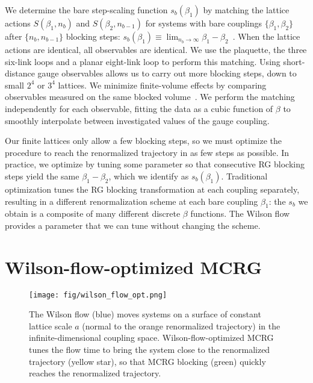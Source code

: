 \documentclass{PoS}
\newcommand{\be}{\ensuremath{\beta} }
\begin{document}
We determine the bare step-scaling function $s_b(\be_1)$ by matching the lattice actions $S(\be_1, n_b)$ and $S(\be_2, n_{b - 1})$ for systems with bare couplings $\{\be_1, \be_2\}$ after $\{n_b, n_{b - 1}\}$ blocking steps: $s_b(\be_1) \equiv \lim_{n_b \to \infty} \be_1 - \be_2$~\cite{Petropoulos:2012mg}.
When the lattice actions are identical, all observables are identical.
We use the plaquette, the three six-link loops and a planar eight-link loop to perform this matching.
Using short-distance gauge observables allows us to carry out more blocking steps, down to small $2^4$ or $3^4$ lattices.
We minimize finite-volume effects by comparing observables measured on the same blocked volume~\cite{Hasenfratz:2011xn}.
We perform the matching independently for each observable, fitting the data as a cubic function of \be to smoothly interpolate between investigated values of the gauge coupling.

Our finite lattices only allow a few blocking steps, so we must optimize the procedure to reach the renormalized trajectory in as few steps as possible.
In practice, we optimize by tuning some parameter so that consecutive RG blocking steps yield the same $\be_1 - \be_2$, which we identify as $s_b(\be_1)$.
Traditional optimization tunes the RG blocking transformation at each coupling separately, resulting in a different renormalization scheme at each bare coupling $\be_1$: the $s_b$ we obtain is a composite of many different discrete \be functions.
The Wilson flow provides a parameter that we can tune without changing the scheme.



\section{\label{sec:wmcrg}Wilson-flow-optimized MCRG} %
\begin{figure}[th]
  \centering
  \texttt{[image: fig/wilson\_flow\_opt.png]}
  \caption{The Wilson flow (blue) moves systems on a surface of constant lattice scale $a$ (normal to the orange renormalized trajectory) in the infinite-dimensional coupling space.  Wilson-flow-optimized MCRG tunes the flow time to bring the system close to the renormalized trajectory (yellow star), so that MCRG blocking (green) quickly reaches the renormalized trajectory.}
  \label{fig:wflow_opt}
\end{figure}
\end{document}
